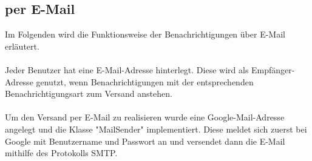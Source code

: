\subsection{per E-Mail}

Im Folgenden wird die Funktionsweise der Benachrichtigungen über E-Mail erläutert.
\\\\
Jeder Benutzer hat eine E-Mail-Adresse hinterlegt. Diese wird als Empfänger-Adresse genutzt, wenn Benachrichtigungen mit der entsprechenden Benachrichtigungsart zum Versand anstehen.
\\\\
Um den Versand per E-Mail zu realisieren wurde eine Google-Mail-Adresse angelegt und die Klasse "MailSender" implementiert. Diese meldet sich zuerst bei Google mit Benutzername und Passwort an und versendet dann die E-Mail mithilfe des Protokolls SMTP.
\\\\
